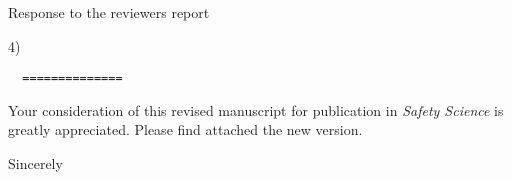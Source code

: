 \documentclass[a4paper,12pt]{letter}
\begin{document}
\begin{letter}{Response to the reviewers report}
{4) 


\begin{verbatim}
  ==============
\end{verbatim}

}

Your consideration of this revised manuscript for publication in 
\textit{Safety Science} is greatly appreciated. 
Please find attached the new version. \\


\closing{Sincerely}


\end{letter}
\end{document}
